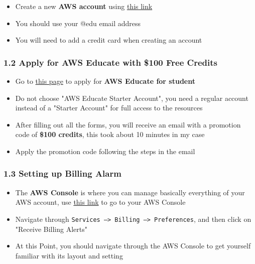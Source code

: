 \documentclass[]{article}
\begin{document}
\begin{itemize}
\item
  Create a new \textbf{AWS account} using
  \href{https://portal.aws.amazon.com/billing/signup\#/start}{this link}
\item
  You should use your @edu email address
\item
  You will need to add a credit card when creating an account
\end{itemize}

\hypertarget{header-n56}{%
\subsubsection{1.2 Apply for AWS Educate with \$100 Free
Credits}\label{header-n56}}

\begin{itemize}
\item
  Go to \href{https://aws.amazon.com/education/awseducate/}{this page}
  to apply for \textbf{AWS Educate for student}
\item
  Do not choose "AWS Educate Starter Account", you need a regular
  account instead of a "Starter Account" for full access to the
  resources
\item
  After filling out all the forms, you will receive an email with a
  promotion code of \textbf{\$100 credits}, this took about 10 minutes
  in my case
\item
  Apply the promotion code following the steps in the email
\end{itemize}

\hypertarget{header-n70}{%
\subsubsection{1.3 Setting up Billing Alarm}\label{header-n70}}

\begin{itemize}
\item
  The \textbf{AWS Console} is where you can manage basically everything
  of your AWS account, use \href{https://console.aws.amazon.com/}{this
  link} to go to your AWS Console
\item
  Navigate through
  \texttt{Services\ —\textgreater{}\ Billing\ —\textgreater{}\ Preferences},
  and then click on "Receive Billing Alerts"
\item
  At this Point, you should navigate through the AWS Console to get
  yourself familiar with its layout and setting
\end{itemize}
\end{document}
